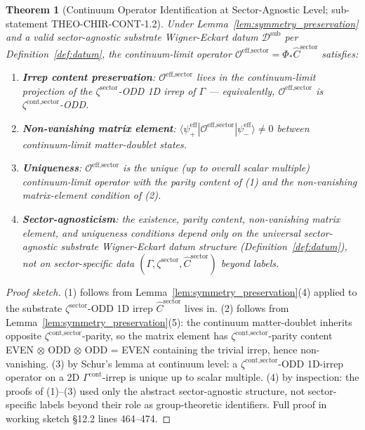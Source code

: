 \documentclass[11pt,letterpaper]{article}
\newtheorem{theorem}{Theorem}[section]
\newcommand{\Phicont}{\Phi_*}
\begin{document}
\begin{theorem}[Continuum Operator Identification at Sector-Agnostic Level; sub-statement THEO-CHIR-CONT-1.2]
\label{thm:continuum_operator_id}
Under Lemma~\ref{lem:symmetry_preservation} and a valid sector-agnostic substrate Wigner-Eckart datum $\mathcal{D}^{\text{sub}}$ per Definition~\ref{def:datum}, the continuum-limit operator $\mathcal{O}^{\text{eff,sector}} = \Phicont\hat{C}^{\text{sector}}$ satisfies:
\begin{enumerate}[leftmargin=*]
\item \textbf{Irrep content preservation}: $\mathcal{O}^{\text{eff,sector}}$ lives in the continuum-limit projection of the $\zeta^{\text{sector}}$-ODD 1D irrep of $\Gamma$ --- equivalently, $\mathcal{O}^{\text{eff,sector}}$ is $\zeta^{\text{cont,sector}}$-ODD.
\item \textbf{Non-vanishing matrix element}: $\langle\psi^{\text{eff}}_+|\mathcal{O}^{\text{eff,sector}}|\psi^{\text{eff}}_-\rangle \neq 0$ between continuum-limit matter-doublet states.
\item \textbf{Uniqueness}: $\mathcal{O}^{\text{eff,sector}}$ is the unique (up to overall scalar multiple) continuum-limit operator with the parity content of (1) and the non-vanishing matrix-element condition of (2).
\item \textbf{Sector-agnosticism}: the existence, parity content, non-vanishing matrix element, and uniqueness conditions depend only on the universal sector-agnostic substrate Wigner-Eckart datum structure (Definition~\ref{def:datum}), not on sector-specific data $(\Gamma, \zeta^{\text{sector}}, \hat{C}^{\text{sector}})$ beyond labels.
\end{enumerate}
\end{theorem}

\begin{proof}[Proof sketch]
(1) follows from Lemma~\ref{lem:symmetry_preservation}(4) applied to the substrate $\zeta^{\text{sector}}$-ODD 1D irrep $\hat{C}^{\text{sector}}$ lives in. (2) follows from Lemma~\ref{lem:symmetry_preservation}(5): the continuum matter-doublet inherits opposite $\zeta^{\text{cont,sector}}$-parity, so the matrix element has $\zeta^{\text{cont,sector}}$-parity content EVEN $\otimes$ ODD $\otimes$ ODD = EVEN containing the trivial irrep, hence non-vanishing. (3) by Schur's lemma at continuum level: a $\zeta^{\text{cont,sector}}$-ODD 1D-irrep operator on a 2D $\Gamma^{\text{cont}}$-irrep is unique up to scalar multiple. (4) by inspection: the proofs of (1)--(3) used only the abstract sector-agnostic structure, not sector-specific labels beyond their role as group-theoretic identifiers. Full proof in working sketch \cite{ChiContSketch} §12.2 lines 464--474.
\end{proof}
\end{document}
